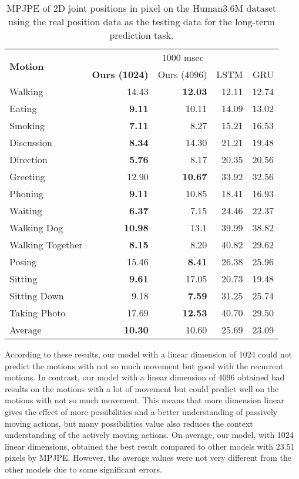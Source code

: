\begin{table}
    \centering
    \caption{MPJPE of 2D joint positions in pixel on the Human3.6M dataset using the real position data as the testing data for the long-term prediction task.}
    \begin{tabular}{l|rrrr}
        \toprule
        \multirow{2}{*}{\textbf{Motion}} & \multicolumn{4}{c}{1000 msec} \\
            & \textbf{Ours (1024)} & Ours (4096) & LSTM & GRU  \\
        \midrule
        
        Walking	&	14.43	&	\textbf{12.03}	&	12.11	&	12.74\\
Eating	&	\textbf{9.11}	&	10.11	&	14.09	&	13.02\\
Smoking	&	\textbf{7.11}	&	8.27	&	15.21	&	16.53\\
Discussion	&	\textbf{8.34}	&	14.30	&	21.21	&	19.48\\
Direction	&	\textbf{5.76}	&	8.17	&	20.35	&	20.56\\
Greeting	&	12.90	&	\textbf{10.67}	&	33.92	&	32.56\\
Phoning	&	\textbf{9.11}	&	10.85	&	18.41	&	16.93\\
Waiting	&	\textbf{6.37}	&	7.15	&	24.46	&	22.37\\
Walking Dog		&	\textbf{10.98}	&	13.1	&	39.99	&	38.82\\
Walking Together	&	\textbf{8.15}	&	8.20	&	40.82	&	29.62\\
Posing	&	15.46	&	\textbf{8.41}	&	26.38	&	25.96\\
Sitting	&	\textbf{9.61}	&	17.05	&	20.73	&	19.48\\
Sitting Down	&	9.18	&	\textbf{7.59}	&	31.25	&	25.74 \\
Taking Photo	&	17.69	&	\textbf{12.53}	&	40.70	&	29.50\\

        \midrule
        Average	&	\textbf{10.30}	&	10.60	&	25.69	&	23.09\\
        \bottomrule
    \end{tabular}
    \label{tbl:2DMPJPE_gt_long}
\end{table}

According to these results, our model with a linear dimension of 1024 could not predict the motions with not so much movement but good with the recurrent motions. In contrast, our model with a linear dimension of 4096 obtained bad results on the motions with a lot of movement but could predict well on the motions with not so much movement. This means that more dimension linear gives the effect of more possibilities and a better understanding of passively moving actions, but many possibilities value also reduces the context understanding of the actively moving actions.
On average, our model, with 1024 linear dimensions, obtained the best result compared to other models with 23.51 pixels by MPJPE. However, the average values were not very different from the other models due to some significant errors.


